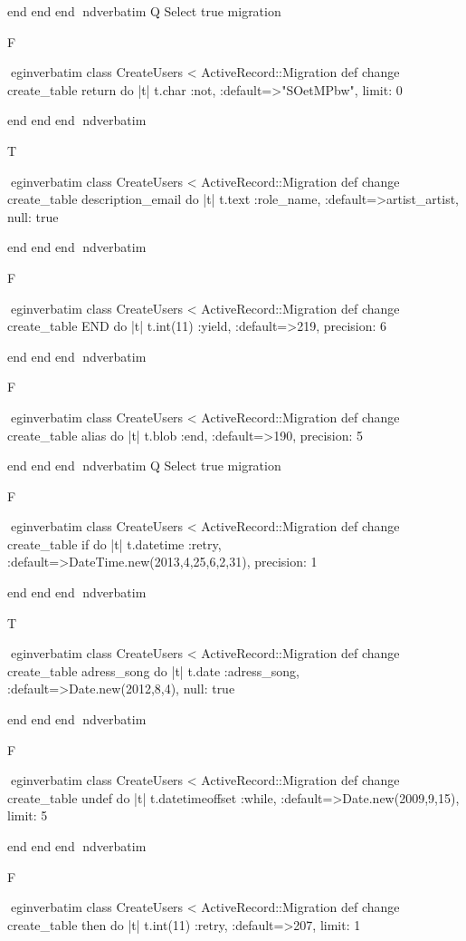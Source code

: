     end 
  end 
end
nd{verbatim}
Q
 Select true migration

F

egin{verbatim}
 class CreateUsers < ActiveRecord::Migration 
  def change 
    create_table return do |t| 
      t.char :not, :default=>"SOetMPbw", limit: 0
    
    end 
  end 
end
nd{verbatim}

T

egin{verbatim}
 class CreateUsers < ActiveRecord::Migration 
  def change 
    create_table description_email do |t| 
      t.text :role_name, :default=>artist_artist, null: true
    
    end 
  end 
end
nd{verbatim}

F

egin{verbatim}
 class CreateUsers < ActiveRecord::Migration 
  def change 
    create_table END do |t| 
      t.int(11) :yield, :default=>219, precision: 6
    
    end 
  end 
end
nd{verbatim}

F

egin{verbatim}
 class CreateUsers < ActiveRecord::Migration 
  def change 
    create_table alias do |t| 
      t.blob :end, :default=>190, precision: 5
    
    end 
  end 
end
nd{verbatim}
Q
 Select true migration

F

egin{verbatim}
 class CreateUsers < ActiveRecord::Migration 
  def change 
    create_table if do |t| 
      t.datetime :retry, :default=>DateTime.new(2013,4,25,6,2,31), precision: 1
    
    end 
  end 
end
nd{verbatim}

T

egin{verbatim}
 class CreateUsers < ActiveRecord::Migration 
  def change 
    create_table adress_song do |t| 
      t.date :adress_song, :default=>Date.new(2012,8,4), null: true
    
    end 
  end 
end
nd{verbatim}

F

egin{verbatim}
 class CreateUsers < ActiveRecord::Migration 
  def change 
    create_table undef do |t| 
      t.datetimeoffset :while, :default=>Date.new(2009,9,15), limit: 5
    
    end 
  end 
end
nd{verbatim}

F

egin{verbatim}
 class CreateUsers < ActiveRecord::Migration 
  def change 
    create_table then do |t| 
      t.int(11) :retry, :default=>207, limit: 1
    
